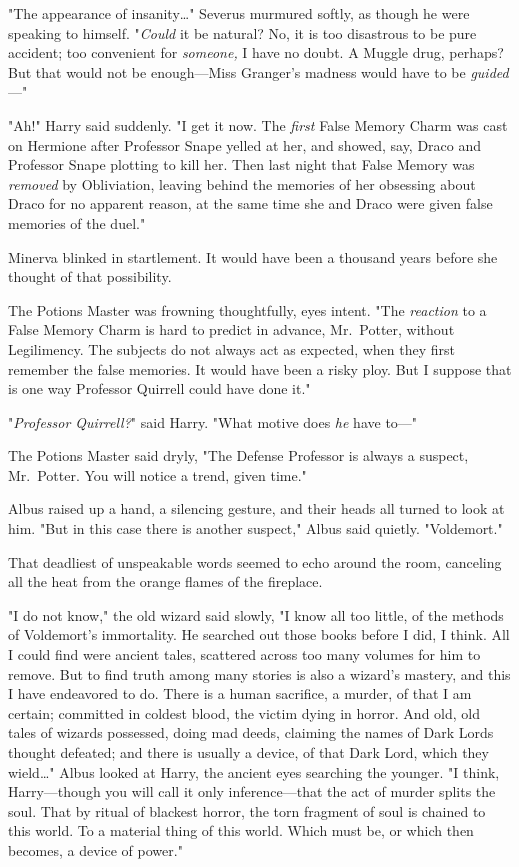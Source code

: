 "The appearance of insanity{\ldots}" Severus murmured softly, as though he were 
speaking to himself. "\emph{Could} it be natural? No, it is too disastrous to 
be pure accident; too convenient for \emph{someone,} I have no doubt. A Muggle 
drug, perhaps? But that would not be enough---Miss Granger's madness would have 
to be \emph{guided}---"

"Ah!" Harry said suddenly. "I get it now. The \emph{first} False Memory Charm 
was cast on Hermione after Professor Snape yelled at her, and showed, say, 
Draco and Professor Snape plotting to kill her. Then last night that False 
Memory was \emph{removed} by Obliviation, leaving behind the memories of her 
obsessing about Draco for no apparent reason, at the same time she and Draco 
were given false memories of the duel."

Minerva blinked in startlement. It would have been a thousand years before she 
thought of that possibility.

The Potions Master was frowning thoughtfully, eyes intent. "The \emph{reaction} 
to a False Memory Charm is hard to predict in advance, Mr.~Potter, without 
Legilimency. The subjects do not always act as expected, when they first 
remember the false memories. It would have been a risky ploy. But I suppose 
that is one way Professor Quirrell could have done it."

"\emph{Professor Quirrell?}" said Harry. "What motive does \emph{he} have to---"

The Potions Master said dryly, "The Defense Professor is always a suspect, 
Mr.~Potter. You will notice a trend, given time."

Albus raised up a hand, a silencing gesture, and their heads all turned to look 
at him. "But in this case there is another suspect," Albus said quietly. 
"Voldemort."

That deadliest of unspeakable words seemed to echo around the room, canceling 
all the heat from the orange flames of the fireplace.

"I do not know," the old wizard said slowly, "I know all too little, of the 
methods of Voldemort's immortality. He searched out those books before I did, I 
think. All I could find were ancient tales, scattered across too many volumes 
for him to remove. But to find truth among many stories is also a wizard's 
mastery, and this I have endeavored to do. There is a human sacrifice, a 
murder, of that I am certain; committed in coldest blood, the victim dying in 
horror. And old, old tales of wizards possessed, doing mad deeds, claiming the 
names of Dark Lords thought defeated; and there is usually a device, of that 
Dark Lord, which they wield{\ldots}" Albus looked at Harry, the ancient eyes 
searching the younger. "I think, Harry---though you will call it only 
inference---that the act of murder splits the soul. That by ritual of blackest 
horror, the torn fragment of soul is chained to this world. To a material thing 
of this world. Which must be, or which then becomes, a device of power."

